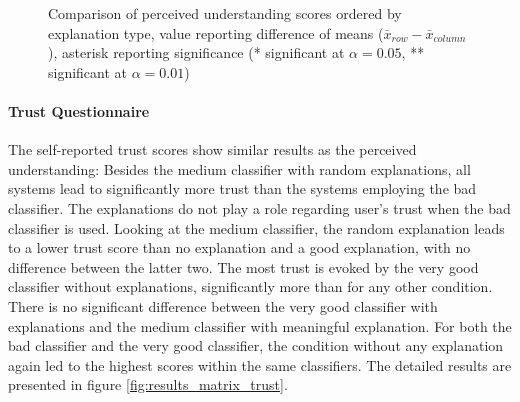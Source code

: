\begin{figure}[H]
{\begin{minipage}[t]{0.65\textwidth}
			\caption{Comparison of perceived understanding scores ordered by explanation type, value reporting difference of means ($\bar{x}_{row} - \bar{x}_{column}$ ), asterisk reporting significance (* significant at $\alpha=0.05$, ** significant at $\alpha=0.01$)}
			\label{fig:results_matrix_understanding_reordered}
		\end{minipage}}
\end{figure}


\paragraph{Trust Questionnaire}
The self-reported trust scores show similar results as the perceived understanding: Besides the medium classifier with random explanations, all systems lead to significantly more trust than the systems employing the bad classifier. The explanations do not play a role regarding user's trust when the bad classifier is used. Looking at the medium classifier, the random explanation leads to a lower trust score than no explanation and a good explanation, with no difference between the latter two. The most trust is evoked by the very good classifier without explanations, significantly more than for any other condition. There is no significant difference between the very good classifier with explanations and the medium classifier with meaningful explanation. For both the bad classifier and the very good classifier, the condition without any explanation again led to the highest scores within the same classifiers. The detailed results are presented in figure \ref{fig:results_matrix_trust}.

\begin{table}[h]
	\caption{Mean scores for self-reported trust measure}
	\label{fig:results_table_trust}
\end{table}

